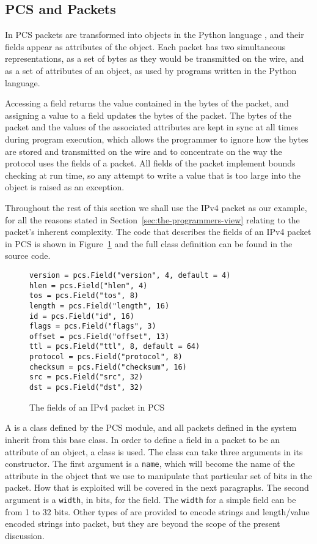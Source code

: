 \documentclass{sig-alternate-10pt}
\begin{document}
\subsection{PCS and Packets}
\label{sec:pcs-and-packets}

In PCS packets are transformed into objects in the Python language
\cite{vanrossum:pyref}, and their fields appear as attributes of the
object.  Each packet has two simultaneous representations, as a set of
bytes as they would be transmitted on the wire, and as a set of
attributes of an object, as used by programs written in the Python
language.

Accessing a field returns the value contained in the bytes of the
packet, and assigning a value to a field updates the bytes of the
packet.  The bytes of the packet and the values of the associated
attributes are kept in sync at all times during program execution,
which allows the programmer to ignore how the bytes are stored and
transmitted on the wire and to concentrate on the way the protocol
uses the fields of a packet.  All fields of the packet implement
bounds checking at run time, so any attempt to write a value that is
too large into the object is raised as an exception.  

Throughout the rest of this section we shall use the IPv4 packet as
our example, for all the reasons stated in
Section~\ref{sec:the-programmers-view} relating to the packet's
inherent complexity.  The code that describes the fields of an IPv4
packet in PCS is shown in Figure~\ref{fig:ipv4-packet-in-pcs} and the
full class definition can be found in the source code.

\begin{figure}
  \centering
\begin{verbatim}
version = pcs.Field("version", 4, default = 4)
hlen = pcs.Field("hlen", 4)
tos = pcs.Field("tos", 8)
length = pcs.Field("length", 16)
id = pcs.Field("id", 16)
flags = pcs.Field("flags", 3)
offset = pcs.Field("offset", 13)
ttl = pcs.Field("ttl", 8, default = 64)
protocol = pcs.Field("protocol", 8)
checksum = pcs.Field("checksum", 16)
src = pcs.Field("src", 32)
dst = pcs.Field("dst", 32)
\end{verbatim}
  \caption{The fields of an IPv4 packet in PCS}
  \label{fig:ipv4-packet-in-pcs}
\end{figure}

A  is a class defined by the PCS module, and all packets
defined in the system inherit from this base class.  In order to
define a field in a packet to be an attribute of an object, a
 class is used.  The  class can take three
arguments in its constructor.  The first argument is a \verb|name|,
which will become the name of the attribute in the object that we use
to manipulate that particular set of bits in the packet.  How that is
exploited will be covered in the next paragraphs.  The second argument
is a \verb|width|, in bits, for the field.  The \verb|width| for a
simple field can be from 1 to 32 bits.  Other types of 
are provided to encode strings and length/value encoded strings into
packet, but they are beyond the scope of the present discussion.
\end{document}
